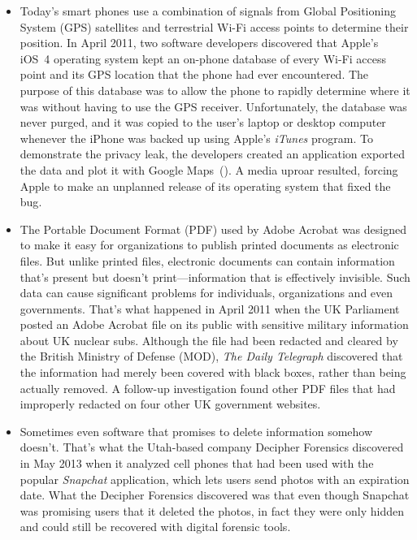 \begin{itemize}
\item Today's smart phones use a combination of signals from Global
  Positioning System (GPS) satellites and terrestrial Wi-Fi access
  points to determine their position. In April 2011, two software
  developers discovered that Apple's iOS~4 operating system kept an
  on-phone database of every Wi-Fi access point and its GPS location
  that the phone had ever encountered. The purpose of this database
  was to allow the phone to rapidly determine where it was without
  having to use the GPS receiver. Unfortunately, the database was
  never purged, and it was copied to the user's laptop or desktop
  computer whenever the iPhone was backed up using Apple's
  \emph{iTunes} program\cite{apple-tracking}. To demonstrate the
  privacy leak, the developers created an application exported the
  data and plot it with Google Maps~(). A media uproar
  resulted, forcing Apple to make an unplanned release of its
  operating system that fixed the bug\cite{apple-tracking-statement}.

\item The Portable Document Format (PDF) used by Adobe Acrobat was
  designed to make it easy for organizations to publish printed
  documents as electronic files. But unlike printed files, electronic
  documents can contain information that's present but doesn't
  print---information that is effectively invisible. Such data can
  cause significant problems for individuals, organizations and even
  governments. That's what happened in April 2011 when the UK
  Parliament posted an Adobe Acrobat file on its public with sensitive
  military information about UK nuclear subs. Although the file had
  been redacted and cleared by the British Ministry of Defense (MOD),
  \emph{The Daily Telegraph} discovered that the information had
  merely been covered with black boxes, rather than being actually
  removed.\label{uk-mod} A follow-up investigation found other PDF
  files that had improperly redacted on four other UK government
  websites\cite{telegraph-april2011-secrets}.

\item Sometimes even software that promises to delete information
  somehow doesn't. That's what the Utah-based company Decipher
  Forensics discovered in May 2013 when it analyzed cell phones that
  had been used with the popular \emph{Snapchat} application, which
  lets users send photos with an expiration date. What the Decipher
  Forensics discovered was that even 
  though Snapchat was promising users that it deleted the photos, in
  fact they were only hidden and could still be recovered with
  digital forensic tools\cite{ksl-snap-chat}.

\end{itemize}


